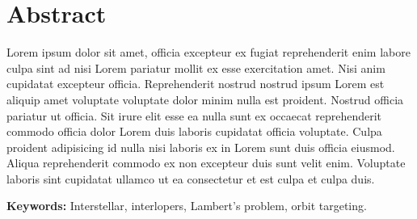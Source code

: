 \chapter*{Abstract}

Lorem ipsum dolor sit amet, officia excepteur ex fugiat reprehenderit enim
labore culpa sint ad nisi Lorem pariatur mollit ex esse exercitation amet. Nisi
anim cupidatat excepteur officia. Reprehenderit nostrud nostrud ipsum Lorem est
aliquip amet voluptate voluptate dolor minim nulla est proident. Nostrud officia
pariatur ut officia. Sit irure elit esse ea nulla sunt ex occaecat reprehenderit
commodo officia dolor Lorem duis laboris cupidatat officia voluptate. Culpa
proident adipisicing id nulla nisi laboris ex in Lorem sunt duis officia
eiusmod. Aliqua reprehenderit commodo ex non excepteur duis sunt velit enim.
Voluptate laboris sint cupidatat ullamco ut ea consectetur et est culpa et culpa
duis.

\vspace{4cm}
\textbf{Keywords:} Interstellar, interlopers, Lambert's problem, orbit targeting.
